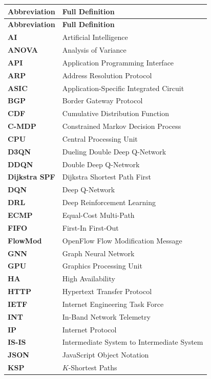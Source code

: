 \documentclass[12pt,a4paper,oneside]{report}
\begin{document}
\begin{longtable}{ll}
\toprule
\textbf{Abbreviation} & \textbf{Full Definition} \\
\midrule
\endfirsthead
\toprule
\textbf{Abbreviation} & \textbf{Full Definition} \\
\midrule
\endhead
\bottomrule
\endfoot
\textbf{AI} & Artificial Intelligence \\
\textbf{ANOVA} & Analysis of Variance \\
\textbf{API} & Application Programming Interface \\
\textbf{ARP} & Address Resolution Protocol \\
\textbf{ASIC} & Application-Specific Integrated Circuit \\
\textbf{BGP} & Border Gateway Protocol \\
\textbf{CDF} & Cumulative Distribution Function \\
\textbf{C-MDP} & Constrained Markov Decision Process \\
\textbf{CPU} & Central Processing Unit \\
\textbf{D3QN} & Dueling Double Deep Q-Network \\
\textbf{DDQN} & Double Deep Q-Network \\
\textbf{Dijkstra SPF} & Dijkstra Shortest Path First \\
\textbf{DQN} & Deep Q-Network \\
\textbf{DRL} & Deep Reinforcement Learning \\
\textbf{ECMP} & Equal-Cost Multi-Path \\
\textbf{FIFO} & First-In First-Out \\
\textbf{FlowMod} & OpenFlow Flow Modification Message \\
\textbf{GNN} & Graph Neural Network \\
\textbf{GPU} & Graphics Processing Unit \\
\textbf{HA} & High Availability \\
\textbf{HTTP} & Hypertext Transfer Protocol \\
\textbf{IETF} & Internet Engineering Task Force \\
\textbf{INT} & In-Band Network Telemetry \\
\textbf{IP} & Internet Protocol \\
\textbf{IS-IS} & Intermediate System to Intermediate System \\
\textbf{JSON} & JavaScript Object Notation \\
\textbf{KSP} & $K$-Shortest Paths \\

\end{longtable}
\end{document}
